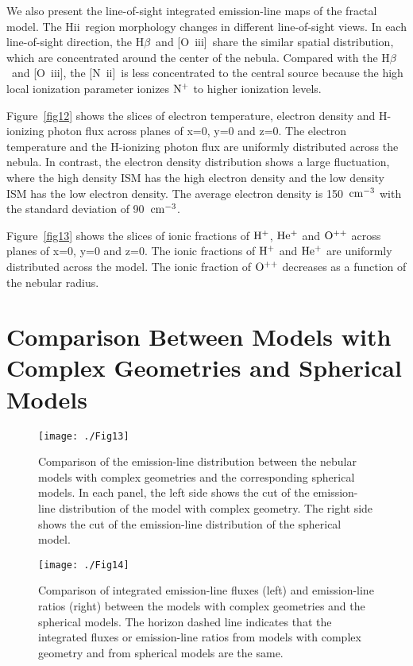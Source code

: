 \documentclass[twocolumn]{aastex62}
\newcommand{\hb}{H$\beta$}    %
\newcommand{\oiii}{[O~{\sc iii}]}
\newcommand{\nii}{[N~{\sc ii}]}
\newcommand{\hiireg}{{H{\sc ii}}}
\begin{document}
\begin{CJK*}{UTF8}{gbsn}
We also present the line-of-sight integrated emission-line maps of the fractal model.
The \hiireg\ region morphology changes in different line-of-sight views.
In each line-of-sight direction, the \hb\ and \oiii\ share the similar spatial distribution, which are concentrated around the center of the nebula.
Compared with the \hb\ and \oiii , the \nii\ is less concentrated to the central source because the high local ionization parameter ionizes $\rm N^{+}$ to higher ionization levels. 

Figure~\ref{fig12} shows the slices of electron temperature, electron density and H-ionizing photon flux across planes of x=0, y=0 and z=0. 
The electron temperature and the H-ionizing photon flux are uniformly distributed across the nebula.
In contrast, the electron density distribution shows a large fluctuation, where the high density ISM has the high electron density and the low density ISM has the low electron density.
The average electron density is 150~$\rm cm^{-3}$ with the standard deviation of 90~$\rm cm^{-3}$.

Figure~\ref{fig13} shows the slices of ionic fractions of $\rm H^{+}$, $\rm He^{+}$ and $\rm O^{++}$ across planes of x=0, y=0 and z=0.
The ionic fractions of $\rm H^{+}$ and $\rm He^{+}$ are uniformly distributed across the model.
The ionic fraction of $\rm O^{++}$ decreases as a function of the nebular radius.




\section{Comparison Between Models with Complex Geometries and Spherical Models}

\begin{figure*}
  \centering
  \texttt{[image: ./Fig13]}
  \caption{Comparison of the emission-line distribution between the nebular models with complex geometries and the corresponding spherical models. In each panel, the left side shows the cut of the emission-line distribution of the model with complex geometry. The right side shows the cut of the emission-line distribution of the spherical model.}\label{fig14}
\end{figure*}

\begin{figure*}
  \centering
  \texttt{[image: ./Fig14]}
  \caption{Comparison of integrated emission-line fluxes (left) and emission-line ratios (right) between the models with complex geometries and the spherical models. The horizon dashed line indicates that the integrated fluxes or emission-line ratios from models with complex geometry and from spherical models are the same. }\label{fig15}
\end{figure*}


\end{CJK*}
\end{document}
